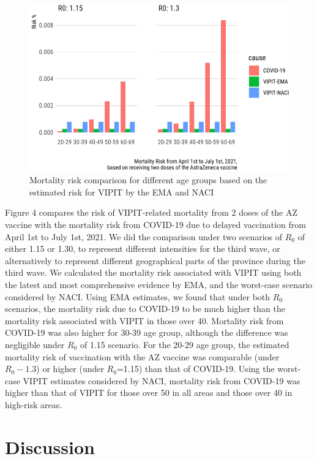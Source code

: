 \documentclass[]{interact}
\theoremstyle{plain}%
\theoremstyle{definition}
\theoremstyle{remark}
\begin{document}
\begin{figure}

{\centering \includegraphics[width=0.9\linewidth]{theCaseforAZ_files/figure-latex/covidvsvipit-1} 

}

\caption{Mortality risk comparison for different age groups based on the estimated risk for VIPIT by the EMA and NACI}\label{fig:covidvsvipit}
\end{figure}

Figure 4 compares the risk of VIPIT-related mortality from 2 doses of
the AZ vaccine with the mortality risk from COVID-19 due to delayed
vaccination from April 1st to July 1st, 2021. We did the comparison
under two scenarios of \(R_0\) of either 1.15 or 1.30, to represent
different intensities for the third wave, or alternatively to represent
different geographical parts of the province during the third wave. We
calculated the mortality risk associated with VIPIT using both the
latest and most comprehensive evidence by EMA, and the worst-case
scenario considered by NACI. Using EMA estimates, we found that under
both \(R_0\) scenarios, the mortality risk due to COVID-19 to be much
higher than the mortality risk associated with VIPIT in those over 40.
Mortality risk from COVID-19 was also higher for 30-39 age group,
although the difference was negligible under \(R_0\) of 1.15 scenario.
For the 20-29 age group, the estimated mortality risk of vaccination
with the AZ vaccine was comparable (under \(R_0-1.3\)) or higher (under
\(R_0\)=1.15) than that of COVID-19. Using the worst-case VIPIT
estimates considered by NACI, mortality risk from COVID-19 was higher
than that of VIPIT for those over 50 in all areas and those over 40 in
high-risk areas.

\hypertarget{discussion}{%
\section{Discussion}\label{discussion}}
\end{document}
